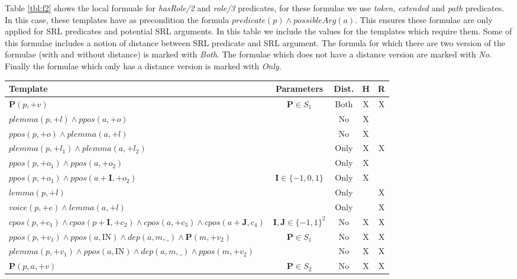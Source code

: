 Table \ref{tbl:f2} shows the local formuale for \emph{hasRole/2} and 
\emph{role/3} predicates,  for these formulae we use \emph{token}, 
\emph{extended} and \emph{path} predicates. In this case, these templates have 
as precondition the formula $predicate(p) \land possibleArg(a)$. This ensures 
these formulae are only applied for SRL predicates and potential SRL arguments.  
In this table we include the values for the templates which require them. Some 
of this formulae includes a notion of distance between SRL predicate and SRL 
argument. The formula for which there are two version of the formulae (with and 
without distance) is marked with \emph{Both}. The formulae which does not have a 
distance version are marked with \emph{No}. Finally the formulae which only has 
a distance version is marked with \emph{Only}.
\begin{table*}[th]
\centering
\begin{tabular}{|>{\small}p{10cm}|>{\small}c|>{\small}c|>{\small}c|>{\small}c|}\hline
 Template               & Parameters & Dist. & H & R \\\hline\hline
   $ \mathbf{P}(p,+v)         $    & $\mathbf{P} \in S_1$   & Both & X & X \\
   $ plemma (p,+l) \land ppos(a,+o) $   & & No    & X &  \\
   $ ppos(p,+o)    \land plemma(a,+l)  $   & & No    & X &  \\
   $ plemma(p,+l_1) \land plemma(a,+l_2)$   & & Only  & X & X \\
   $ ppos(p,+o_1) \land ppos(a,+o_2)$       & & Only  & X &   \\
   $ ppos(p,+o_1) \land ppos(a+\mathbf{I},+o_2)$     & $\mathbf{I} \in 
   \{-1,0,1\}$ & Only& X &   \\
   $ lemma(p,+l)$ & & Only & & X  \\
   $ voice(p,+e) \land lemma(a,+l)$ & & Only & & X  \\
   $ cpos(p,+c_1) \land cpos(p+\mathbf{I},+c_2) \land cpos(a,+c_3) \land 
   cpos(a+\mathbf{J},c_4)$ & $\mathbf{I},\mathbf{J} \in \{-1,1\}^2$ & No & X & 
   X\\
   $ ppos(p,+v_1) \land ppos(a,\text{IN}) \land dep(a,m,\_) \land \mathbf{P}(m,+v_2) $ & $\mathbf{P} \in S_1$ & No & X &  X \\
   $ plemma(p,+v_1) \land ppos(a,\text{IN}) \land dep(a,m,\_) \land ppos(m,+v_2) $ & & No & X &  X \\
   $ \mathbf{P}(p,a,+v)         $    & $\mathbf{P} \in S_2$ & No & X & X \\

\end{tabular}
\end{table*}
